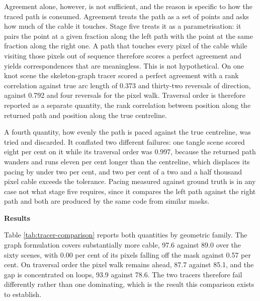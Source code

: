 Agreement alone, however, is not sufficient, and the reason is specific to how the traced path is consumed. Agreement treats the path as a set of points and asks how much of the cable it touches. Stage five treats it as a parametrisation: it pairs the point at a given fraction along the left path with the point at the same fraction along the right one. A path that touches every pixel of the cable while visiting those pixels out of sequence therefore scores a perfect agreement and yields correspondences that are meaningless. This is not hypothetical. On one knot scene the skeleton-graph tracer scored a perfect agreement with a rank correlation against true arc length of 0.373 and thirty-two reversals of direction, against 0.792 and four reversals for the pixel walk. Traversal order is therefore reported as a separate quantity, the rank correlation between position along the returned path and position along the true centreline.

A fourth quantity, how evenly the path is paced against the true centreline, was tried and discarded. It conflated two different failures: one tangle scene scored eight per cent on it while its traversal order was 0.997, because the returned path wanders and runs eleven per cent longer than the centreline, which displaces its pacing by under two per cent, and two per cent of a two and a half thousand pixel cable exceeds the tolerance. Pacing measured against ground truth is in any case not what stage five requires, since it compares the left path against the right path and both are produced by the same code from similar masks.

\vspace{0.2cm}
\noindent \textbf{Results}
\vspace{0.2cm}

Table \ref{tab:tracer-comparison} reports both quantities by geometric family. The graph formulation covers substantially more cable, 97.6 against 89.0 over the sixty scenes, with 0.00 per cent of its pixels falling off the mask against 0.57 per cent. On traversal order the pixel walk remains ahead, 87.7 against 85.1, and the gap is concentrated on loops, 93.9 against 78.6. The two tracers therefore fail differently rather than one dominating, which is the result this comparison exists to establish.

